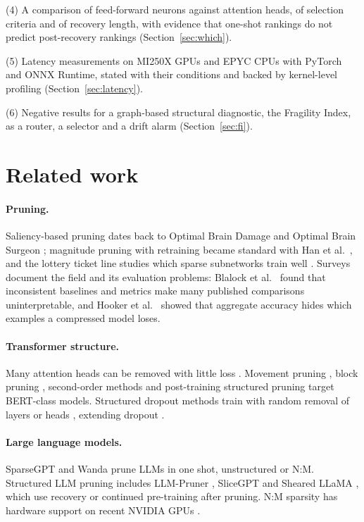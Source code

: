 \documentclass[11pt,a4paper]{article}
\begin{document}
(4) A comparison of feed-forward neurons against attention heads, of selection criteria and of recovery length, with evidence that one-shot rankings do not predict post-recovery rankings (Section~\ref{sec:which}).

(5) Latency measurements on MI250X GPUs and EPYC CPUs with PyTorch and ONNX Runtime, stated with their conditions and backed by kernel-level profiling (Section~\ref{sec:latency}).

(6) Negative results for a graph-based structural diagnostic, the Fragility Index, as a router, a selector and a drift alarm (Section~\ref{sec:fi}).

\section{Related work}
\label{sec:related}

\paragraph{Pruning.} Saliency-based pruning dates back to Optimal Brain Damage and Optimal Brain Surgeon \cite{lecun1990obd,hassibi1993obs}; magnitude pruning with retraining became standard with Han et al.~\cite{han2015learning}, and the lottery ticket line studies which sparse subnetworks train well \cite{frankle2019lottery}. Surveys document the field \cite{hoefler2021sparsity,gale2019state} and its evaluation problems: Blalock et al.~\cite{blalock2020state} found that inconsistent baselines and metrics make many published comparisons uninterpretable, and Hooker et al.~\cite{hooker2019forget} showed that aggregate accuracy hides which examples a compressed model loses.

\paragraph{Transformer structure.} Many attention heads can be removed with little loss \cite{michel2019sixteen,voita2019analyzing}. Movement pruning \cite{sanh2020movement}, block pruning \cite{lagunas2021block}, second-order methods \cite{kurtic2022obert} and post-training structured pruning \cite{kwon2022fast} target BERT-class models. Structured dropout methods train with random removal of layers or heads \cite{fan2020layerdrop,zhou2020drophead}, extending dropout \cite{srivastava2014dropout}.

\paragraph{Large language models.} SparseGPT \cite{frantar2023sparsegpt} and Wanda \cite{sun2024wanda} prune LLMs in one shot, unstructured or N:M. Structured LLM pruning includes LLM-Pruner \cite{ma2023llmpruner}, SliceGPT \cite{ashkboos2024slicegpt} and Sheared LLaMA \cite{xia2024sheared}, which use recovery or continued pre-training after pruning. N:M sparsity has hardware support on recent NVIDIA GPUs \cite{mishra2021accelerating,zhou2021nm}.
\end{document}
